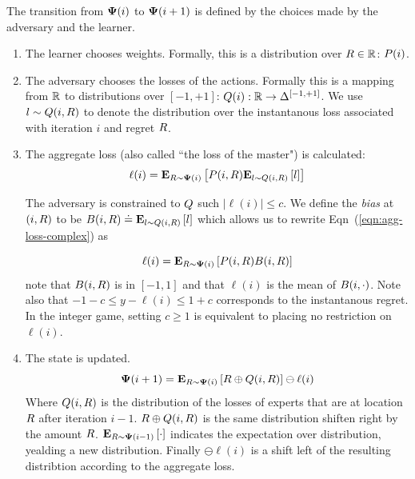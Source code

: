 \documentclass{article}[12pt]
\begin{document}
The transition from ${\bf \Psi}(i)$ to ${\bf \Psi}(i+1)$ is  defined by the
choices made by the adversary and the learner.

\begin{enumerate}
\item The learner chooses weights. Formally, this is
  a distribution over $R \in \mathbb{R}$: $P(i)$.
\item The adversary chooses the losses of the actions. Formally 
  this is a mapping from $\mathbb{R}$ to distributions
  over $[-1,+1]$: $Q(i): \mathbb{R} \to \Delta^{[-1,+1]}$. We use
  $l \sim Q(i,R)$ to denote the distribution over the
  instantanous loss associated with iteration $i$ and regret $R$.
\item The aggregate loss (also called ``the loss of the master") is
  calculated:
  \begin{equation} \label{eqn:agg-loss-complex}
  \ell(i)={\bf E}_{R \sim {\bf \Psi}(i)}\left[ P(i,R) {\bf E}_{l \sim Q(i,R)}\left[ l \right] \right]
  \end{equation}
  
  The adversary is constrained to $Q$ such $|\ell(i)| \leq c$. 
  We define the {\em bias} at $(i,R)$ to be  $B(i,R) \doteq {\bf E}_{l
    \sim Q(i,R)}\left[ l \right]$ which allows us to rewrite
  Eqn~(\ref{eqn:agg-loss-complex}) as
  
  \begin{equation} \label{eqn:aggregate-loss}
    \ell(i)={\bf E}_{R \sim {\bf \Psi}(i)}\left[ P(i,R) B(i,R) \right]
  \end{equation}
  note that $B(i,R)$ is in $[-1,1]$ and that $\ell(i)$ is the mean
  of $B(i,\cdot)$. Note also that $-1-c \leq y-\ell(i) \leq 1+c$
  corresponds to the instantanous regret. In the integer game, setting
  $c \geq 1$ is equivalent to placing no restriction on $\ell(i)$.
  
\item The state is updated. 
  \begin{equation} \label{eqn:state-update}
    {\bf \Psi}(i+1) = {\bf E}_{R \sim {\bf \Psi}(i)}\left[ R \oplus  Q(i,R) \right]
    \ominus \ell(i)
    \end{equation}
  Where $Q(i,R)$ is the distribution of the losses of experts
  that are at location $R$ after iteration $i-1$. $R \oplus
  Q(i,R)$ is the same distribution shiften right by the amount
  $R$. $ {\bf E}_{R \sim  {\bf \Psi}(i-1)}\left[ \cdot \right]$ indicates the expectation over distribution,
  yealding a new distribution. Finally $\ominus \ell(i)$ is a shift
  left of the resulting distribtion according to the aggregate loss. 
\end{enumerate}
\end{document}
